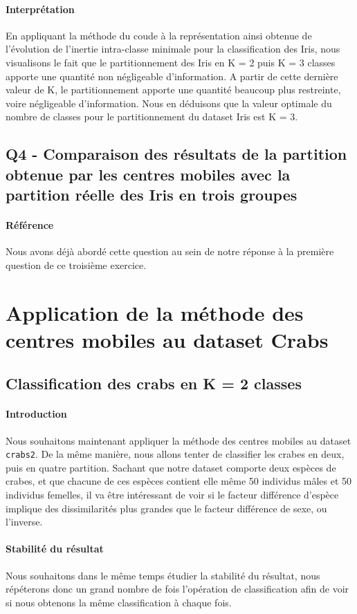 \documentclass{report}
\begin{document}
\paragraph{Interprétation}
En appliquant la méthode du coude à la représentation ainsi obtenue de l'évolution de l'inertie intra-classe minimale pour la classification des Iris, nous visualisons le fait que le partitionnement des Iris en K = 2 puis K = 3 classes apporte une quantité non négligeable d'information. A partir de cette dernière valeur de K, le partitionnement apporte une quantité beaucoup plus restreinte, voire négligeable d'information. Nous en déduisons que la valeur optimale du nombre de classes pour le partitionnement du dataset Iris est K = 3.
\subsection{Q4 - Comparaison des résultats de la partition obtenue par les centres mobiles avec la partition réelle des Iris en trois groupes}
\paragraph{Référence} Nous avons déjà abordé cette question au sein de notre réponse à la première question de ce troisième exercice.
\newpage
\section{Application de la méthode des centres mobiles au dataset Crabs}
\subsection{Classification des crabs en K = 2 classes}
\paragraph{Introduction}
Nous souhaitons maintenant appliquer la méthode des centres mobiles au dataset \verb+crabs2+. De la même manière, nous allons tenter de classifier les crabes en deux, puis en quatre partition. Sachant que notre dataset comporte deux espèces de crabes, et que chacune de ces espèces contient elle même 50 individus mâles et 50 individus femelles, il va être intéressant de voir si le facteur différence d'espèce implique des dissimilarités plus grandes que le facteur différence de sexe, ou l'inverse.
\paragraph{Stabilité du résultat}
Nous souhaitons dans le même temps étudier la stabilité du résultat, nous répéterons donc un grand nombre de fois l'opération de classification afin de voir si nous obtenons la même classification à chaque fois.
\end{document}
